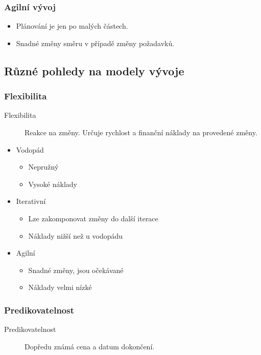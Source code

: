     \subsubsection{Agilní vývoj}
      \begin{itemize}
        \item Plánování je jen po malých částech.
        \item Snadné změny směru v případě změny požadavků.
      \end{itemize}

  \subsection{Různé pohledy na modely vývoje}

    \subsubsection{Flexibilita}
      \begin{description}
        \item[Flexibilita] Reakce na změny. Určuje rychlost a finanční náklady na provedené změny.
      \end{description}

      \begin{itemize}
        \item Vodopád
          \begin{itemize}
            \item Nepružný
            \item Vysoké náklady
          \end{itemize}
        \item Iterativní
          \begin{itemize}
            \item Lze zakomponovat změny do další iterace
            \item Náklady nižší než u vodopádu
          \end{itemize}
        \item Agilní
          \begin{itemize}
            \item Snadné změny, jsou očekávané
            \item Náklady velmi nízké
          \end{itemize}
      \end{itemize}

      \subsubsection{Predikovatelnost}
        \begin{description}
          \item[Predikovatelnost] Dopředu známá cena a datum dokončení.
        \end{description}

